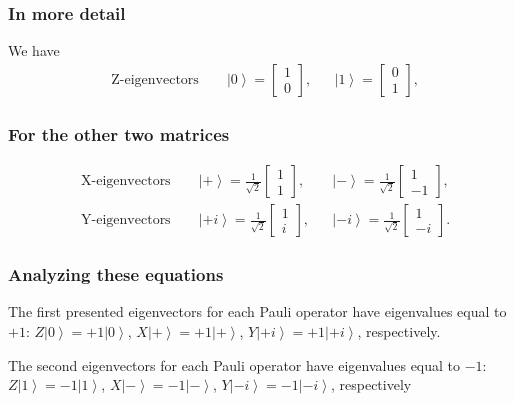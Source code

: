 \documentclass{beamer}
\begin{document}
\begin{frame}
\frametitle{In more detail}

We have
\begin{align*}
&\text{Z-eigenvectors} \qquad
\left| 0 \right\rangle = \begin{bmatrix}
1\\
0
\end{bmatrix},
&&\left| 1 \right\rangle = \begin{bmatrix}
0\\
1
\end{bmatrix},
\end{align*}
\end{frame}

\begin{frame}
\frametitle{For the other two matrices}

\begin{align*}
&\text{X-eigenvectors} \qquad
\left| + \right\rangle = \frac{1}{\sqrt{2}} \begin{bmatrix}
1\\
1
\end{bmatrix},
&&\left| - \right\rangle = \frac{1}{\sqrt{2}} \begin{bmatrix}
1\\
-1
\end{bmatrix},
\\
&\text{Y-eigenvectors} \qquad
\left| +i \right\rangle = \frac{1}{\sqrt{2}} \begin{bmatrix}
1\\
i
\end{bmatrix}, 
&&\left| -i \right\rangle = \frac{1}{\sqrt{2}} \begin{bmatrix}
1\\
-i
\end{bmatrix}.
\end{align*}
\end{frame}

\begin{frame}
\frametitle{Analyzing these equations}

The first presented eigenvectors for each Pauli operator have eigenvalues equal to $+1$: $Z \left| 0 \right\rangle = +1\left| 0 \right\rangle$, $X \left| + \right\rangle = +1\left| + \right\rangle$, $Y \left| +i \right\rangle = +1\left| +i \right\rangle$, respectively.

The second eigenvectors for each Pauli operator have eigenvalues equal to $-1$: $Z \left| 1 \right\rangle = -1\left| 1 \right\rangle$, $X \left| - \right\rangle = -1\left| - \right\rangle$, $Y \left| -i \right\rangle = -1\left| -i \right\rangle$, respectively
\end{frame}
\end{document}

